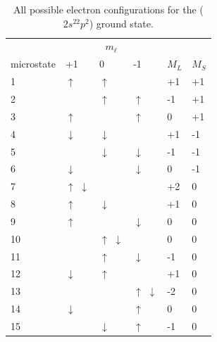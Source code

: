 \documentclass[12pt]{article}
\begin{document}
\begin{table}[ht]
\centering
\caption{All possible electron configurations for the ($2s^22p^2$) ground state.}
\label{table:config1_table1}
\begin{tabular}{|l|lll|ll|}
\hline 
 & \multicolumn{3}{c}{$m_\ell$} & \multicolumn{2}{|c|}{} \\
microstate & +1 & 0 & -1 & $M_L$ & $M_S$ \\
\hline
1  & $\uparrow$               & $\uparrow$              &                         & +1 & +1 \\
2  &                          & $\uparrow$              & $\uparrow$              & -1 & +1 \\
3  & $\uparrow$               &                         & $\uparrow$              &  0 & +1 \\
\hline
4  & $\downarrow$             & $\downarrow$            &                         & +1 & -1 \\
5  &                          & $\downarrow$            & $\downarrow$            & -1 & -1 \\
6  & $\downarrow$             &                         & $\downarrow$            &  0 & -1 \\
\hline
7  & $\uparrow$ $\downarrow$  &                         &                         & +2 &  0 \\
8  & $\uparrow$               & $\downarrow$            &                         & +1 &  0 \\
9  & $\uparrow$               &                         & $\downarrow$            &  0 &  0 \\
10 &                          & $\uparrow$ $\downarrow$ &                         &  0 &  0 \\
11 &                          & $\uparrow$              & $\downarrow$            & -1 &  0 \\
12 & $\downarrow$             & $\uparrow$              &                         & +1 &  0 \\
13 &                          &                         & $\uparrow$ $\downarrow$ & -2 &  0 \\
14 & $\downarrow$             &                         & $\uparrow$              &  0 &  0 \\
15 &                          & $\downarrow$            & $\uparrow$              & -1 &  0 \\
\hline
\end{tabular}
\end{table}
\end{document}
